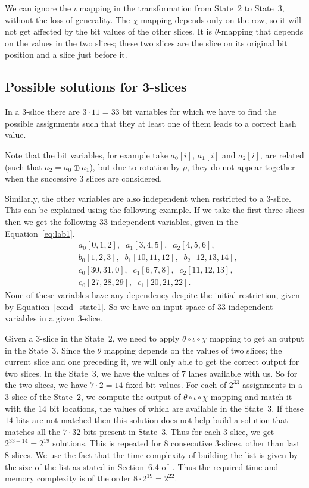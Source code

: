 We can ignore the $\iota$ mapping in the transformation from State~2 to State~3, without the loss of generality. The $\chi$-mapping depends only on the row, so it will not get affected by the bit values of the other slices. It is $\theta$-mapping that depends on the values in the two slices; these two slices are the slice on its original bit position and a slice just before it.

\subsection{Possible solutions for 3-slices} 
In a $3$-slice there are $3 \cdot 11 = 33$ bit variables for which we have to find the possible assignments such that they at least one of them leads to a correct hash value. 

Note that the bit variables, for example take $a_0[i]$, $a_1[i]$ and $a_2[i]$, are related (such that $a_2 = a_0 \oplus a_1$), but due to rotation by $\rho$, they do not appear together when the successive $3$ slices are considered.

Similarly, the other variables are also independent when restricted to a $3$-slice.
This can be explained using the following example. If we take the first three slices then we get the following $33$ independent variables, given in the Equation~\ref{eq:lab1}.
\begin{equation}
\label{eq:lab1}
\begin{aligned}
&a_0[0,1,2],\;\;a_1[3,4,5],\;\;a_2[4,5,6],\\
&b_0[1,2,3],\;\; b_1[10,11,12],\;\;b_2[12,13,14],\\
&c_0[30,31,0],\;\;c_1[6,7,8],\;\;c_2[11,12,13],\\
&e_0[27,28,29],\;\; e_1[20,21,22].
\end{aligned}
\end{equation}
None of these variables have any dependency despite the initial restriction, given by Equation~\ref{cond_state1}. So we have an input space of $33$ independent variables in a given $3$-slice. 

Given a $3$-slice in the State~$2$, we need to apply $\theta \circ \iota \circ \chi$ mapping to get an output in the State~$3$. Since the $\theta$ mapping depends on the values of two slices; the current slice and one preceding it, we will only able to get the correct output for two slices. In the State~$3$, we have the values of $7$ lanes available with us. So for the two slices, we have $7\cdot 2 = 14$ fixed bit values.
For each of $2^{33}$ assignments in a $3$-slice of the State~$2$, we compute the output of $\theta \circ \iota \circ \chi$ mapping and match it with the $14$ bit locations, the values of which are available in the State~$3$. If these $14$ bits are not matched then this solution does not help build a solution that matches all the $7 \cdot 32$ bits present in State~$3$.
Thus for each $3$-slice, we get $2^{33-14} = 2^{19}$ solutions. This is repeated for $8$ consecutive $3$-slices, other than last $8$ slices. We use the fact that the time complexity of building the list is given by the size of the list as stated in Section~6.4 of~\cite{naya2011practical}. Thus the required time and memory complexity is of the order $8 \cdot 2^{19} = 2^{22}$.

